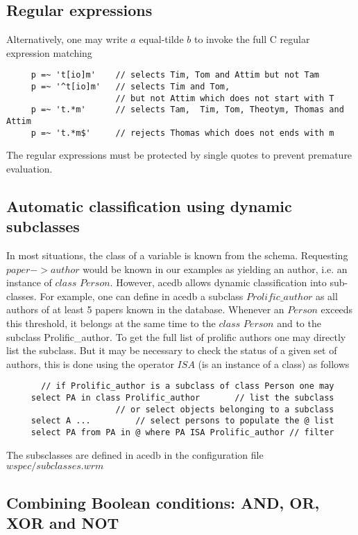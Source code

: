 \documentclass[11pt]{article}
\newcommand{\BL}{\begin{lstlisting}}
\begin{document}
\subsection{Regular expressions}
Alternatively, one may write $a$ equal-tilde $b$ to invoke the full C regular expression matching 
\BL
     p =~ 't[io]m'    // selects Tim, Tom and Attim but not Tam
     p =~ '^t[io]m'   // selects Tim and Tom, 
                      // but not Attim which does not start with T
     p =~ 't.*m'      // selects Tam,  Tim, Tom, Theotym, Thomas and  Attim
     p =~ 't.*m$'     // rejects Thomas which does not ends with m
\end{lstlisting}
The regular expressions must be protected by single quotes to prevent premature evaluation.

\subsection {Automatic classification using dynamic subclasses}
In most situations, the class of a variable is known from the schema. Requesting $paper$$-$$>$$author$
would be known in our examples as yielding an author, i.e. an instance of $class$ $Person$.
However, acedb allows dynamic classification into sub-classes. For example, one can define
in acedb a subclass $Prolific\_author$ as all authors of at least 5 papers
known in the database. Whenever an $Person$ exceeds this threshold, 
it belongs at the same time to the $class$ $Person$ and to the subclass Prolific\_author. 
To get the full list of prolific authors one may directly list the subclass. 
But it may be necessary to check the status of
a given set of authors, this is done using the operator $ISA$ (is an instance of a class)
as follows

\BL
       // if Prolific_author is a subclass of class Person one may 
     select PA in class Prolific_author       // list the subclass
                      // or select objects belonging to a subclass
     select A ...         // select persons to populate the @ list
     select PA from PA in @ where PA ISA Prolific_author // filter
\end{lstlisting}
The subsclasses are defined in acedb in the configuration file $wspec/subclasses.wrm$

\subsection{Combining Boolean conditions: AND, OR, XOR and NOT}
\end{document}
